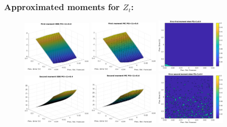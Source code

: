 \documentclass[aspectratio=169]{beamer}\usepackage[utf8]{inputenc}
\begin{document}
\begin{frame}\frametitle{Approximated moments for $Z_t$:}

\begin{figure}[ht!]
\centering
\includegraphics[width=0.3\textwidth]{../../MATLAB_Files/Results/moments/lamperti/errors/fm_ODE_3.eps}\quad
\includegraphics[width=0.3\textwidth]{../../MATLAB_Files/Results/moments/lamperti/errors/fm_MC_3.eps}\quad
\includegraphics[width=0.3\textwidth]{../../MATLAB_Files/Results/moments/lamperti/errors/fm_3.eps}\quad
\includegraphics[width=0.3\textwidth]{../../MATLAB_Files/Results/moments/lamperti/errors/sm_ODE_3.eps}\quad
\includegraphics[width=0.3\textwidth]{../../MATLAB_Files/Results/moments/lamperti/errors/sm_MC_3.eps}\quad
\includegraphics[width=0.3\textwidth]{../../MATLAB_Files/Results/moments/lamperti/errors/sm_3.eps}
\end{figure}

\end{frame}
\end{document}
